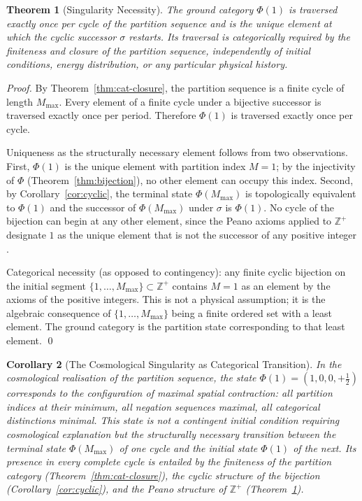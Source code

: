 \documentclass[twocolumn,10pt,a4paper]{article}
\theoremstyle{thmstyle}
\newtheorem{theorem}{Theorem}[section]
\newtheorem{corollary}[theorem]{Corollary}
\theoremstyle{definition}
\theoremstyle{remark}
\newcommand{\Zp}{\mathbb{Z}^{+}}
\newcommand{\Mmax}{M_{\max}}
\newcommand{\PhiMap}{\varPhi}
\begin{document}
\begin{theorem}[Singularity Necessity]
\label{thm:sing-necessity}
The ground category $\PhiMap(1)$ is traversed exactly once per cycle of the partition sequence and is the unique element at which the cyclic successor $\sigma$ restarts. Its traversal is categorically required by the finiteness and closure of the partition sequence, independently of initial conditions, energy distribution, or any particular physical history.
\end{theorem}

\begin{proof}
By Theorem~\ref{thm:cat-closure}, the partition sequence is a finite cycle of length $\Mmax$. Every element of a finite cycle under a bijective successor is traversed exactly once per period. Therefore $\PhiMap(1)$ is traversed exactly once per cycle.

Uniqueness as the structurally necessary element follows from two observations. First, $\PhiMap(1)$ is the unique element with partition index $M = 1$; by the injectivity of $\PhiMap$ (Theorem~\ref{thm:bijection}), no other element can occupy this index. Second, by Corollary~\ref{cor:cyclic}, the terminal state $\PhiMap(\Mmax)$ is topologically equivalent to $\PhiMap(1)$ and the successor of $\PhiMap(\Mmax)$ under $\sigma$ is $\PhiMap(1)$. No cycle of the bijection can begin at any other element, since the Peano axioms applied to $\Zp$ designate $1$ as the unique element that is not the successor of any positive integer \citep{peano1889,dedekind1888}.

Categorical necessity (as opposed to contingency): any finite cyclic bijection on the initial segment $\{1, \ldots, \Mmax\} \subset \Zp$ contains $M = 1$ as an element by the axioms of the positive integers. This is not a physical assumption; it is the algebraic consequence of $\{1, \ldots, \Mmax\}$ being a finite ordered set with a least element. The ground category is the partition state corresponding to that least element. \qed
\end{proof}

\begin{corollary}[The Cosmological Singularity as Categorical Transition]
\label{cor:big-bang}
In the cosmological realisation of the partition sequence, the state $\PhiMap(1) = (1, 0, 0, +\tfrac{1}{2})$ corresponds to the configuration of maximal spatial contraction: all partition indices at their minimum, all negation sequences maximal, all categorical distinctions minimal. This state is not a contingent initial condition requiring cosmological explanation but the structurally necessary transition between the terminal state $\PhiMap(\Mmax)$ of one cycle and the initial state $\PhiMap(1)$ of the next. Its presence in every complete cycle is entailed by the finiteness of the partition category (Theorem~\ref{thm:cat-closure}), the cyclic structure of the bijection (Corollary~\ref{cor:cyclic}), and the Peano structure of $\Zp$ (Theorem~\ref{thm:sing-necessity}).
\end{corollary}
\end{document}
